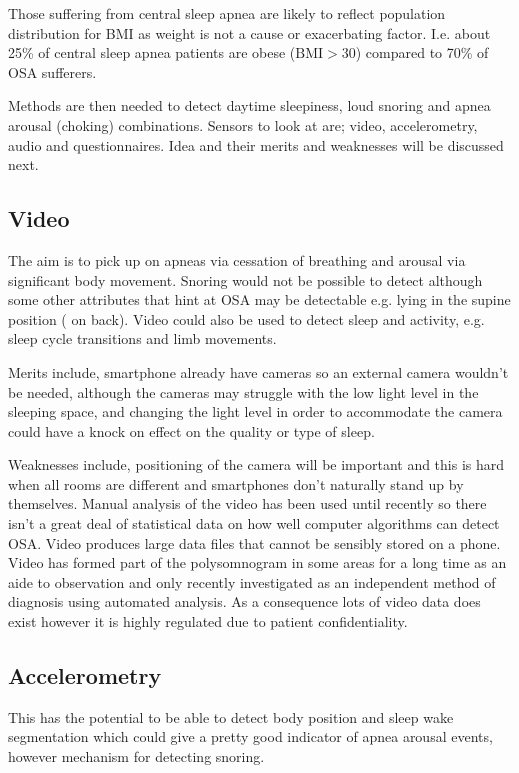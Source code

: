 Those suffering from central sleep apnea are likely to reflect population distribution for BMI as weight is not a cause or exacerbating factor. I.e. about 25\% of central sleep apnea patients are obese ($\text{BMI} > 30$) compared to 70\% of OSA sufferers.

Methods are then needed to detect daytime sleepiness, loud snoring and apnea arousal (choking) combinations. Sensors to look at are; video, accelerometry, audio and questionnaires. Idea and their merits and weaknesses will be discussed next.

\subsection{Video}
The aim is to pick up on apneas via cessation of breathing and arousal via significant body movement. Snoring would not be possible to detect although some other attributes that hint at OSA may be detectable e.g. lying in the supine position ( on back). Video could also be used to detect sleep and activity, e.g. sleep cycle transitions and limb movements. 

Merits include, smartphone already have cameras so an external camera wouldn’t be needed, although the cameras may struggle with the low light level in the sleeping space, and changing the light level in order to accommodate the camera could have a knock on effect on the quality or type of sleep. 

Weaknesses include, positioning of the camera will be important and this is hard when all rooms are different and smartphones don’t naturally stand up by themselves. Manual analysis of the video has been used until recently so there isn’t a great deal of statistical data on how well computer algorithms can detect OSA. Video produces large data files that cannot be sensibly stored on a phone. Video has formed part of the polysomnogram in some areas for a long time as an aide to observation and only recently investigated as an independent method of diagnosis using automated analysis. As a consequence lots of video data does exist however it is highly regulated due to patient confidentiality. 

\subsection{Accelerometry}
This has the potential to be able to detect body position and sleep wake segmentation which could give a pretty good indicator of apnea arousal events, however mechanism for detecting snoring.

